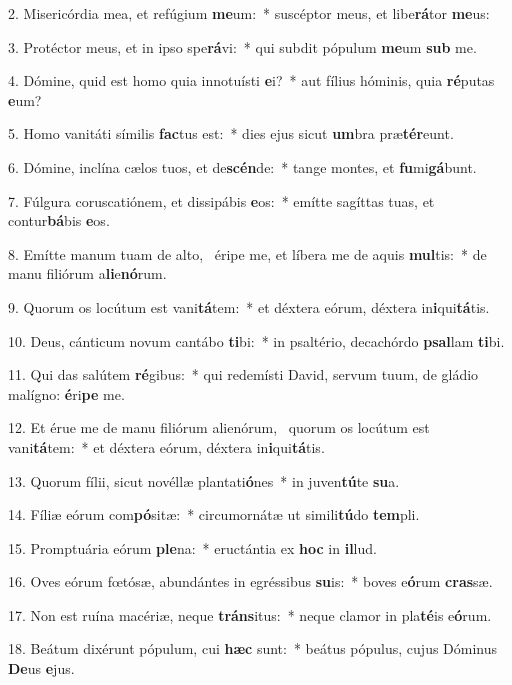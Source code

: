 2. Misericórdia mea, et refúgium \textbf{me}um:~*  suscéptor meus, et libe\textbf{rá}tor \textbf{me}us:\

3. Protéctor meus, et in ipso spe\textbf{rá}vi:~*  qui subdit pópulum \textbf{me}um \textbf{sub} me.\

4. Dómine, quid est homo quia innotuísti \textbf{e}i?~*  aut fílius hóminis, quia \textbf{ré}putas \textbf{e}um?\

5. Homo vanitáti símilis \textbf{fac}tus est:~*  dies ejus sicut \textbf{um}bra præ\textbf{tér}eunt.\

6. Dómine, inclína cælos tuos, et de\textbf{scén}de:~*  tange montes, et \textbf{fu}mi\textbf{gá}bunt.\

7. Fúlgura coruscatiónem, et dissipábis \textbf{e}os:~*  emítte sagíttas tuas, et contur\textbf{bá}bis \textbf{e}os.\

8. Emítte manum tuam de alto, \dag\  éripe me, et líbera me de aquis \textbf{mul}tis:~*  de manu filiórum a\textbf{li}e\textbf{nó}rum.\

9. Quorum os locútum est vani\textbf{tá}tem:~*  et déxtera eórum, déxtera in\textbf{i}qui\textbf{tá}tis.\

10. Deus, cánticum novum cantábo \textbf{ti}bi:~*  in psaltério, decachórdo \textbf{psal}lam \textbf{ti}bi.\

11. Qui das salútem \textbf{ré}gibus:~*  qui redemísti David, servum tuum, de gládio malígno: \textbf{é}ri\textbf{pe} me.\

12. Et érue me de manu filiórum alienórum, \dag\  quorum os locútum est vani\textbf{tá}tem:~*  et déxtera eórum, déxtera in\textbf{i}qui\textbf{tá}tis.\

13. Quorum fílii, sicut novéllæ plantati\textbf{ó}nes~*  in juven\textbf{tú}te \textbf{su}a.\

14. Fíliæ eórum com\textbf{pó}sitæ:~*  circumornátæ ut simili\textbf{tú}do \textbf{tem}pli.\

15. Promptuária eórum \textbf{ple}na:~*  eructántia ex \textbf{hoc} in \textbf{il}lud.\

16. Oves eórum fœtósæ, abundántes in egréssibus \textbf{su}is:~*  boves e\textbf{ó}rum \textbf{cras}sæ.\

17. Non est ruína macériæ, neque \textbf{tráns}itus:~*  neque clamor in pla\textbf{té}is e\textbf{ó}rum.\

18. Beátum dixérunt pópulum, cui \textbf{hæc} sunt:~*  beátus pópulus, cujus Dóminus \textbf{De}us \textbf{e}jus.\


